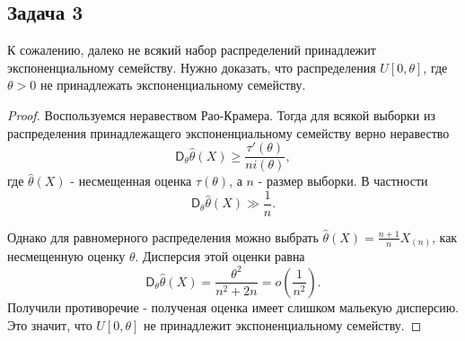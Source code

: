 \subsection*{Задача 3}

К сожалению, далеко не всякий набор распределений принадлежит экспоненциальному семейству. Нужно доказать, что распределения
$U[0, \theta]$, где $\theta > 0$ не принадлежать экспоненциальному семейству.

\begin{proof}
  Воспользуемся неравеством Рао-Крамера. Тогда для всякой выборки из распределения принадлежащего экспоненциальному семейству верно неравество
  $$
  \mathsf{D}_\theta \widehat\theta(X) \geq \frac{\tau'(\theta)}{ni(\theta)},
  $$
  где $\widehat\theta(X)$ - несмещенная оценка $\tau(\theta)$, а $n$ - размер выборки.
  В частности
  $$\mathsf{D}_\theta \widehat\theta(X) \gg \frac{1}{n}.$$
  
  Однако для равномерного распределения можно выбрать $\widehat\theta(X) = \frac{n+1}{n} X_{(n)}$, как несмещенную оценку $\theta$. Дисперсия этой оценки равна
  $$
  \mathsf{D}_\theta \widehat\theta(X) = \frac{\theta^2}{n^2 + 2n} = o\left(\frac{1}{n^2}\right).
  $$
  Получили противоречие - полученая оценка имеет слишком мальекую дисперсию. Это значит, что $U[0, \theta]$ не принадлежит экспоненциальному семейству.
\end{proof}
